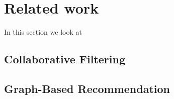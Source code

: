 \section{Related work}
In this section we look at 
\subsection{Collaborative Filtering}


\subsection{Graph-Based Recommendation}




